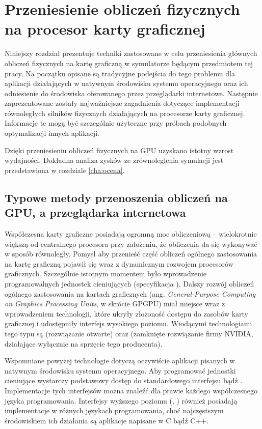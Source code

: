 \chapter{Przeniesienie obliczeń fizycznych na procesor karty graficznej}
\label{cha:oblGPU}

Niniejszy rozdział prezentuje techniki zastosowane w celu przeniesienia głównych
obliczeń fizycznych na kartę graficzną w symulatorze  będącym
przedmiotem tej pracy. Na początku opisane są tradycyjne podejścia do tego
problemu dla aplikacji działających w natywnym środowisku systemu operacyjnego
oraz ich odniesienie do środowiska oferowanego przez przeglądarki internetowe.
Następnie zaprezentowane zostały najważniejsze zagadnienia dotyczące
implementacji równoległych silników fizycznych  działających na
procesorze karty graficznej. Informacje te mogą być szczególnie użyteczne przy
próbach podobnych optymalizacji innych aplikacji.

Dzięki przeniesieniu obliczeń fizycznych na GPU uzyskano istotny wzrost
wydajności. Dokładna analiza zysków ze zrównoleglenia symulacji jest przedstawiona
w rozdziale \ref{cha:ocena}.

\section{Typowe metody przenoszenia obliczeń na GPU, a przeglądarka internetowa}

Współczesna karty graficzne posiadają ogromną moc obliczeniową -- wielokrotnie
większą od centralnego procesora przy założeniu, że obliczenia da się wykonywać
w sposób równoległy. Pomysł aby przenieść część obliczeń ogólnego zastosowania
na kartę graficzną pojawił się wraz z dynamicznym rozwojem procesorów
graficznych. Szczególnie istotnym momentem było wprowadzenie programowalnych
jednostek cieniujących (specyfikacja ). Dalszy rozwój obliczeń
ogólnego zastosowania na kartach graficznych (ang. \emph{General-Purpose
Computing on Graphics Processing Units}, w skrócie GPGPU) miał miejsce wraz z
wprowadzeniem technologii, które ukryły złożoność dostępu do zasobów karty
graficznej i udostępniły interfejs wysokiego poziomu. Wiodącymi technologiami
tego typu są  (rozwiązanie otwarte) oraz  (zamknięte
rozwiązanie firmy NVIDIA, działające wyłącznie na sprzęcie tego producenta).

Wspomniane powyżej technologie dotyczą oczywiście aplikacji pisanych w natywnym
środowisku systemu operacyjnego. Aby programować jednostki cieniujące wystarczy
podstawowy dostęp do standardowego interfejsu  bądź .
Implementacje tych interfejsów można znaleźć dla prawie każdego współczesnego
języka programowania. Interfejsy wyższego poziomu (, )
również posiadają implementacje w różnych językach programowania, choć
najczęstszym środowiskiem ich działania są aplikacje napisane w C bądź C++.

